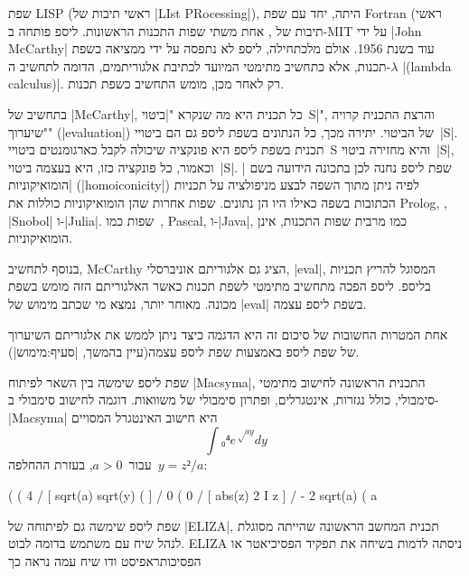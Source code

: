 שפת LISP (ראשי תיבות של \E|LIst PRocessing|), היתה, יחד עם שפת Fortran (ראשי
תיבות של , אחת משתי שפות התכנות הראשונות. ליספ פותחה
ב-MIT על ידי \E|John McCarthy| עוד בשנת 1956. אולם מלכתחילה, ליספ לא נתפסה על
ידי ממציאה כשפת תכנות, אלא כתחשיב מתימטי המיועד לכתיבת אלגוריתמים, הדומה לתחשיב
ה-$λ$ \E|(lambda calculus)|. רק לאחר מכן, מומש התחשיב כשפת תכנות.

בתחשיב של \E|McCarthy|, כל תכנית היא מה שנקרא "\ע|ביטוי~S|", והרצת התכנית קרויה
"שיערוך" (\E|evaluation|) של הביטוי. יתירה מכך, כל הנתונים בשפת ליספ גם הם
ביטויי~\E|S|. תכנית בשפת ליספ היא פונקציה שיכולה לקבל כארגומנטים ביטויי~S והיא
מחזירה ביטוי~\E|S|, וכאמור, כל פונקציה כזו, היא בעצמה ביטוי~\E|S|. שפת ליספ
נחנה לכן בתכונה הידועה בשם \ע|הומואיקוניות| (\E|homoiconicity|) לפיה ניתן מתוך
השפה לבצע מניפולציה על תכניות הכתובות בשפה כאילו היו הן נתונים. שפות אחרות שהן
הומואיקוניות כוללות את Prolog, , \E|Snobol|
ו-\E|Julia|. שפות כמו~\CPL, Pascal, ו-\E|Java|, כמו מרבית שפות התכנות, אינן
הומואיקוניות.

בנוסף לתחשיב, McCarthy הציג גם אלגוריתם אוניברסלי, \E|eval|, המסוגל להריץ תכניות
בליספ. ליספ הפכה מתחשיב מתימטי לשפת תכנות כאשר האלגוריתם הזה מומש בשפת מכונה.
מאוחר יותר, נמצא מי שכתב מימוש של \E|eval| בשפת ליספ עצמה.

אחת המטרות החשובות של סיכום זה היא הדגמה כיצד ניתן לממש את אלגוריתם השיערוך של
שפת ליספ באמצעות שפת ליספ עצמה(עיין בהמשך, |סעיף:מימוש|).

שפת ליספ שימשה בין השאר לפיתוח \E|Macsyma|, התכנית הראשונה לחישוב מתימטי
סימבולי, כולל נגזרות, אינטגרלים, ופתרון סימבולי של משוואות.
דוגמה לחישוב סימבולי ב-\E|Macsyma| היא חישוב האינטגרל המסויים \[
  ∫₀⁴ e^{√{ay}}dy
\] עבור~$a>0$, בעזרת ההחלפה~$y=z²/a$:

\minipage\textwidth
  \scriptsize
  \begin{LISP}
(%
(%
                      4
                     /
                     [ sqrt(a) sqrt(y) (%
                     ]
                     /
                      0
(%
                      0
                     /
                     [ abs(z)
                   2 I z %
                     ]
                     /
- 2 sqrt(a)
(%
                                a
\end{LISP}
\endminipage

שפת ליספ שימשה גם לפיתוחה של \E|ELIZA|, תכנית המחשב הראשונה שהייתה מסוגלת לנהל
שיח עם משתמש בדומה לבוט. ELIZA ניסתה לדמות בשיחה את תפקיד הפסיכיאטר או
הפסיכותראפיסט ודו שיח עמה נראה כך

